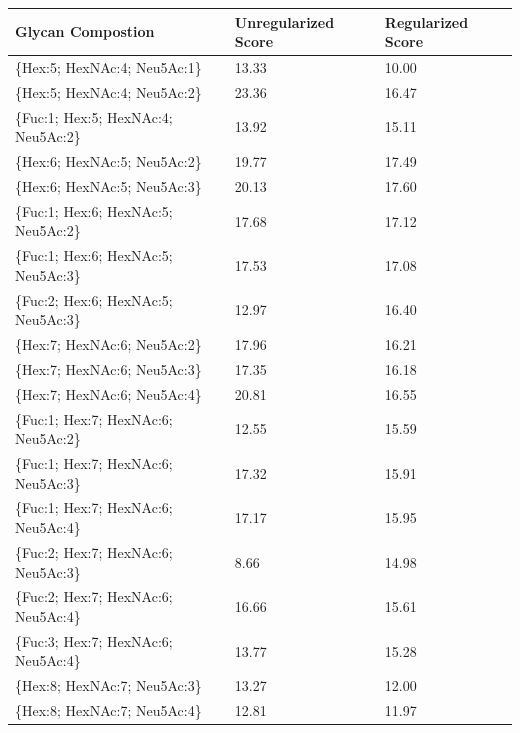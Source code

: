 \begin{table}
\begin{minipage}[t]{0.55\linewidth}
    \begin{footnotesize}
    \begin{tabular}{l|p{2cm} p{2cm}}
Glycan Compostion &  Unregularized Score &  Regularized Score \\
\hline
\{Hex:5; HexNAc:4; Neu5Ac:1\}        &                13.33 &              10.00 \\
\{Hex:5; HexNAc:4; Neu5Ac:2\}        &                23.36 &              16.47 \\
\{Fuc:1; Hex:5; HexNAc:4; Neu5Ac:2\} &                13.92 &              15.11 \\
\{Hex:6; HexNAc:5; Neu5Ac:2\}        &                19.77 &              17.49 \\
\{Hex:6; HexNAc:5; Neu5Ac:3\}        &                20.13 &              17.60 \\
\{Fuc:1; Hex:6; HexNAc:5; Neu5Ac:2\} &                17.68 &              17.12 \\
\{Fuc:1; Hex:6; HexNAc:5; Neu5Ac:3\} &                17.53 &              17.08 \\
\{Fuc:2; Hex:6; HexNAc:5; Neu5Ac:3\} &                12.97 &              16.40 \\
\{Hex:7; HexNAc:6; Neu5Ac:2\}        &                17.96 &              16.21 \\
\{Hex:7; HexNAc:6; Neu5Ac:3\}        &                17.35 &              16.18 \\
\{Hex:7; HexNAc:6; Neu5Ac:4\}        &                20.81 &              16.55 \\
\{Fuc:1; Hex:7; HexNAc:6; Neu5Ac:2\} &                12.55 &              15.59 \\
\{Fuc:1; Hex:7; HexNAc:6; Neu5Ac:3\} &                17.32 &              15.91 \\
\{Fuc:1; Hex:7; HexNAc:6; Neu5Ac:4\} &                17.17 &              15.95 \\
\{Fuc:2; Hex:7; HexNAc:6; Neu5Ac:3\} &                 8.66 &              14.98 \\
\{Fuc:2; Hex:7; HexNAc:6; Neu5Ac:4\} &                16.66 &              15.61 \\
\{Fuc:3; Hex:7; HexNAc:6; Neu5Ac:4\} &                13.77 &              15.28 \\
\{Hex:8; HexNAc:7; Neu5Ac:3\}        &                13.27 &              12.00 \\
\{Hex:8; HexNAc:7; Neu5Ac:4\}        &                12.81 &              11.97 \\

\end{tabular}
\end{footnotesize}
\end{minipage}
\end{table}
